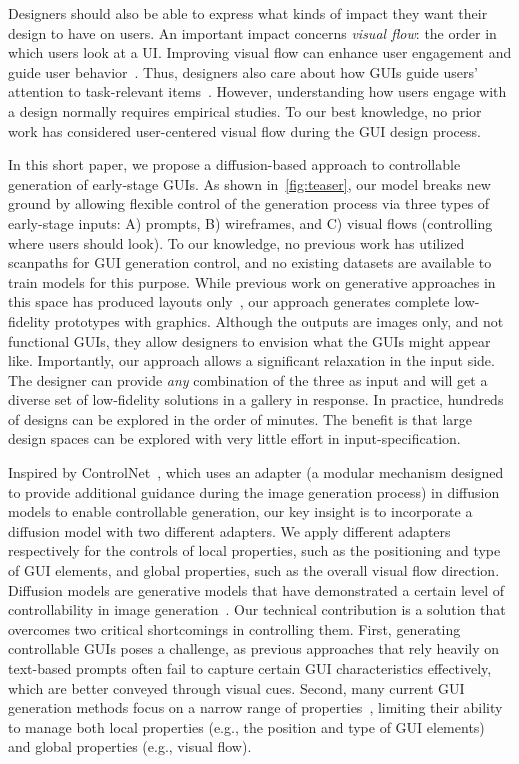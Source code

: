 Designers should also be able to express what kinds of impact they want their design to have on users.
%
An important impact concerns \emph{visual flow}:
the order in which users look at a UI.
Improving visual flow can enhance user engagement and guide user behavior~\cite{Rosenholtz11, Still10, ueyes, jiang2024ueyes, wang2024visrecall++, emami2024impact}. 
Thus, designers also care about how GUIs guide users' attention to task-relevant items~\cite{Rosenholtz11, Still10, ueyes}. 
%
However, understanding how users engage with a design normally requires empirical studies. 
%
To our best knowledge, no prior work has considered user-centered visual flow during the GUI design process.

In this short paper, we propose a diffusion-based approach to controllable generation of early-stage GUIs. 
As shown in~\autoref{fig:teaser}, our model breaks new ground by allowing flexible control of the generation process via three types of early-stage inputs: A) prompts, B) wireframes, and C) visual flows (controlling where users should look). To our knowledge, no previous work has utilized scanpaths for GUI generation control, and no existing datasets are available to train models for this purpose.
%
While previous work on generative approaches in this space has produced layouts only~\cite{cheng2023play, cheng2024colay}, our approach generates complete low-fidelity prototypes with graphics. Although the outputs are images only, and not functional GUIs, they allow designers to envision what the GUIs might appear like. 
%
Importantly, our approach allows a significant relaxation in the input side. 
The designer can provide \emph{any} combination of the three as input and will get a diverse set of low-fidelity solutions in a gallery in response. 
In practice, hundreds of designs can be explored in the order of minutes.
%
The benefit is that large design spaces can be explored with very little effort in input-specification. 

Inspired by ControlNet~\cite{controlnet}, which uses an adapter (a modular mechanism designed to provide additional guidance during the image generation process) in diffusion models to enable controllable generation, our key insight is to incorporate a diffusion model with two different adapters.
We apply different adapters respectively for the controls of local properties, such as the positioning and type of GUI elements, and global properties, such as the overall visual flow direction. 
Diffusion models are generative models that have demonstrated a certain level of controllability in image generation~\cite{controlnet, controlnet_plus_plus}.
%
Our technical contribution is a solution that overcomes two critical shortcomings in controlling them. 
First, generating controllable GUIs poses a challenge, as previous approaches that rely heavily on text-based prompts often fail to capture certain GUI characteristics effectively, which are better conveyed through visual cues.
Second, many current GUI generation methods focus on a narrow range of properties~\cite{cheng2023play, cheng2024colay}, limiting their ability to manage both local properties (e.g., the position and type of GUI elements) and global properties (e.g., visual flow).


